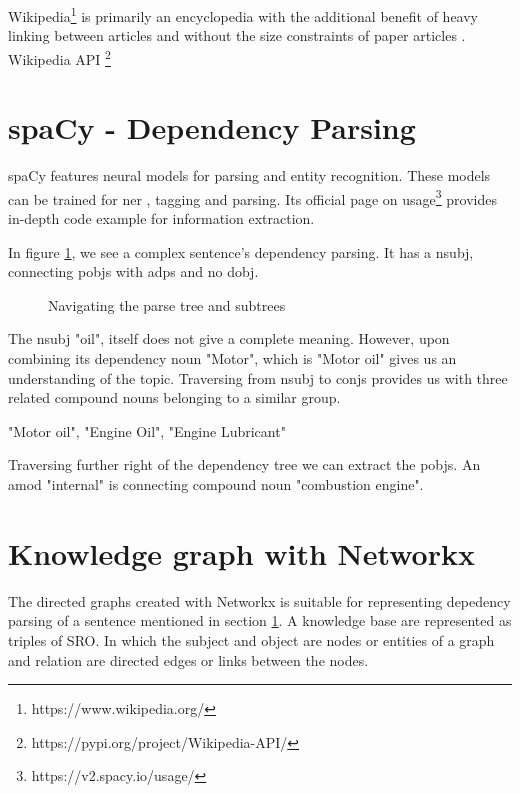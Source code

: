 Wikipedia\footnote{https://www.wikipedia.org/} is primarily an encyclopedia with the additional benefit of heavy linking between articles and without the size constraints of paper articles \parencite{TorstenZesch}. Wikipedia API \footnote{https://pypi.org/project/Wikipedia-API/}

\section{spaCy - Dependency Parsing} \label{dependencyparsing}

spaCy \parencite{spacy2} features neural models for parsing and entity recognition. These models can be trained for \acf{ner} , tagging and parsing. Its official page on usage\footnote {https://v2.spacy.io/usage/} provides in-depth code example for information extraction.

In figure \ref{fig:dp}, we see a complex sentence's dependency parsing. It has a \acf{nsubj}, connecting \acfp{pobj} with \acfp{adp} and no \acf{dobj}.

\begin{figure}[htp!]
    \centering    
    
    \caption{Navigating the parse tree and subtrees}
    \label{fig:dp}
\end{figure}

The \acs{nsubj} "oil", itself does not give a complete meaning. However, upon combining its dependency noun "Motor", which is "Motor oil"  gives us an understanding of the topic. Traversing from \acs{nsubj} to  \acfp{conj} provides us with three related compound nouns belonging to a similar group.

"Motor oil", "Engine Oil", "Engine Lubricant"

Traversing further right of the dependency tree we can extract the \acsp{pobj}.  An \acf{amod} "internal" is connecting compound noun "combustion engine".

\section{Knowledge graph with Networkx}

The directed graphs created with Networkx \parencite{hagberg2008exploring} is suitable for representing depedency parsing of a sentence mentioned in section \ref{dependencyparsing}. A knowledge base are represented as triples of \acf{SRO}. In which the subject and object are nodes or entities of a graph and relation are directed edges or links between the nodes.

